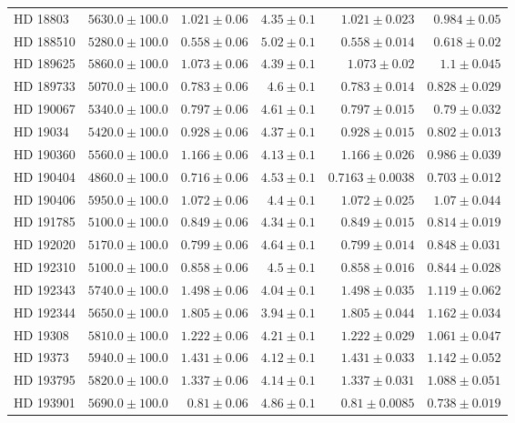 \begin{longtable*}{lrrrrr}
HD 18803 & $5630.0\pm 100.0$ & $1.021\pm 0.06$ & $4.35\pm 0.1$ & $1.021\pm 0.023$ & $0.984\pm 0.05$ \\ 
HD 188510 & $5280.0\pm 100.0$ & $0.558\pm 0.06$ & $5.02\pm 0.1$ & $0.558\pm 0.014$ & $0.618\pm 0.02$ \\ 
HD 189625 & $5860.0\pm 100.0$ & $1.073\pm 0.06$ & $4.39\pm 0.1$ & $1.073\pm 0.02$ & $1.1\pm 0.045$ \\ 
HD 189733 & $5070.0\pm 100.0$ & $0.783\pm 0.06$ & $4.6\pm 0.1$ & $0.783\pm 0.014$ & $0.828\pm 0.029$ \\ 
HD 190067 & $5340.0\pm 100.0$ & $0.797\pm 0.06$ & $4.61\pm 0.1$ & $0.797\pm 0.015$ & $0.79\pm 0.032$ \\ 
HD 19034 & $5420.0\pm 100.0$ & $0.928\pm 0.06$ & $4.37\pm 0.1$ & $0.928\pm 0.015$ & $0.802\pm 0.013$ \\ 
HD 190360 & $5560.0\pm 100.0$ & $1.166\pm 0.06$ & $4.13\pm 0.1$ & $1.166\pm 0.026$ & $0.986\pm 0.039$ \\ 
HD 190404 & $4860.0\pm 100.0$ & $0.716\pm 0.06$ & $4.53\pm 0.1$ & $0.7163\pm 0.0038$ & $0.703\pm 0.012$ \\ 
HD 190406 & $5950.0\pm 100.0$ & $1.072\pm 0.06$ & $4.4\pm 0.1$ & $1.072\pm 0.025$ & $1.07\pm 0.044$ \\ 
HD 191785 & $5100.0\pm 100.0$ & $0.849\pm 0.06$ & $4.34\pm 0.1$ & $0.849\pm 0.015$ & $0.814\pm 0.019$ \\ 
HD 192020 & $5170.0\pm 100.0$ & $0.799\pm 0.06$ & $4.64\pm 0.1$ & $0.799\pm 0.014$ & $0.848\pm 0.031$ \\ 
HD 192310 & $5100.0\pm 100.0$ & $0.858\pm 0.06$ & $4.5\pm 0.1$ & $0.858\pm 0.016$ & $0.844\pm 0.028$ \\ 
HD 192343 & $5740.0\pm 100.0$ & $1.498\pm 0.06$ & $4.04\pm 0.1$ & $1.498\pm 0.035$ & $1.119\pm 0.062$ \\ 
HD 192344 & $5650.0\pm 100.0$ & $1.805\pm 0.06$ & $3.94\pm 0.1$ & $1.805\pm 0.044$ & $1.162\pm 0.034$ \\ 
HD 19308 & $5810.0\pm 100.0$ & $1.222\pm 0.06$ & $4.21\pm 0.1$ & $1.222\pm 0.029$ & $1.061\pm 0.047$ \\ 
HD 19373 & $5940.0\pm 100.0$ & $1.431\pm 0.06$ & $4.12\pm 0.1$ & $1.431\pm 0.033$ & $1.142\pm 0.052$ \\ 
HD 193795 & $5820.0\pm 100.0$ & $1.337\pm 0.06$ & $4.14\pm 0.1$ & $1.337\pm 0.031$ & $1.088\pm 0.051$ \\ 
HD 193901 & $5690.0\pm 100.0$ & $0.81\pm 0.06$ & $4.86\pm 0.1$ & $0.81\pm 0.0085$ & $0.738\pm 0.019$ \\ 

\end{longtable*}
